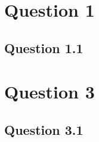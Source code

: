 \documentclass[11pt,twoside,a4paper]{article}
\begin{document}
\section{Question 1}

	\subsection{Question 1.1}
	
\section{Question 3}

	\subsection{Question 3.1}
	

		
	
\begin{thebibliography}{9}
\end{thebibliography}
\end{document}
